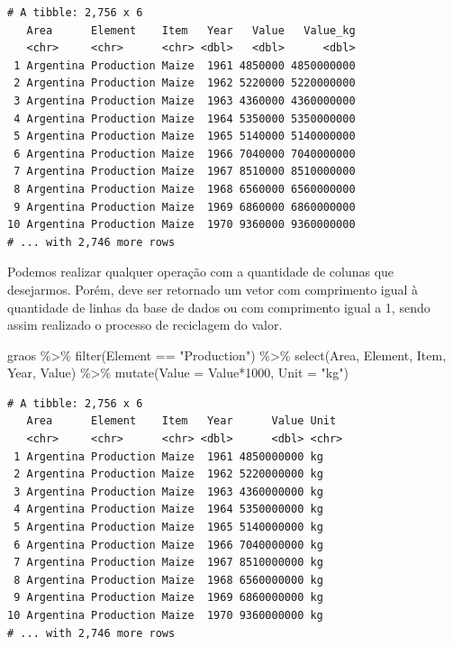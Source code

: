 \documentclass[
  brazilian,
]{book}
\newenvironment{Shaded}{\begin{snugshade}}{\end{snugshade}}
\newcommand{\AttributeTok}[1]{\textcolor[rgb]{0.77,0.63,0.00}{#1}}
\newcommand{\DecValTok}[1]{\textcolor[rgb]{0.00,0.00,0.81}{#1}}
\newcommand{\FunctionTok}[1]{\textcolor[rgb]{0.00,0.00,0.00}{#1}}
\newcommand{\NormalTok}[1]{#1}
\newcommand{\SpecialCharTok}[1]{\textcolor[rgb]{0.00,0.00,0.00}{#1}}
\newcommand{\StringTok}[1]{\textcolor[rgb]{0.31,0.60,0.02}{#1}}
\begin{document}
\begin{verbatim}
# A tibble: 2,756 x 6
   Area      Element    Item   Year   Value   Value_kg
   <chr>     <chr>      <chr> <dbl>   <dbl>      <dbl>
 1 Argentina Production Maize  1961 4850000 4850000000
 2 Argentina Production Maize  1962 5220000 5220000000
 3 Argentina Production Maize  1963 4360000 4360000000
 4 Argentina Production Maize  1964 5350000 5350000000
 5 Argentina Production Maize  1965 5140000 5140000000
 6 Argentina Production Maize  1966 7040000 7040000000
 7 Argentina Production Maize  1967 8510000 8510000000
 8 Argentina Production Maize  1968 6560000 6560000000
 9 Argentina Production Maize  1969 6860000 6860000000
10 Argentina Production Maize  1970 9360000 9360000000
# ... with 2,746 more rows
\end{verbatim}

Podemos realizar qualquer operação com a quantidade de colunas que desejarmos. Porém, deve ser retornado um vetor com comprimento igual à quantidade de linhas da base de dados ou com comprimento igual a 1, sendo assim realizado o processo de reciclagem do valor.

\begin{Shaded}
\begin{Highlighting}[]
\NormalTok{graos }\SpecialCharTok{\%\textgreater{}\%} 
  \FunctionTok{filter}\NormalTok{(Element }\SpecialCharTok{==} \StringTok{"Production"}\NormalTok{) }\SpecialCharTok{\%\textgreater{}\%} 
  \FunctionTok{select}\NormalTok{(Area, Element, Item, Year, Value) }\SpecialCharTok{\%\textgreater{}\%} 
  \FunctionTok{mutate}\NormalTok{(}\AttributeTok{Value =}\NormalTok{ Value}\SpecialCharTok{*}\DecValTok{1000}\NormalTok{,}
         \AttributeTok{Unit =} \StringTok{"kg"}\NormalTok{)}
\end{Highlighting}
\end{Shaded}

\begin{verbatim}
# A tibble: 2,756 x 6
   Area      Element    Item   Year      Value Unit 
   <chr>     <chr>      <chr> <dbl>      <dbl> <chr>
 1 Argentina Production Maize  1961 4850000000 kg   
 2 Argentina Production Maize  1962 5220000000 kg   
 3 Argentina Production Maize  1963 4360000000 kg   
 4 Argentina Production Maize  1964 5350000000 kg   
 5 Argentina Production Maize  1965 5140000000 kg   
 6 Argentina Production Maize  1966 7040000000 kg   
 7 Argentina Production Maize  1967 8510000000 kg   
 8 Argentina Production Maize  1968 6560000000 kg   
 9 Argentina Production Maize  1969 6860000000 kg   
10 Argentina Production Maize  1970 9360000000 kg   
# ... with 2,746 more rows
\end{verbatim}
\end{document}

